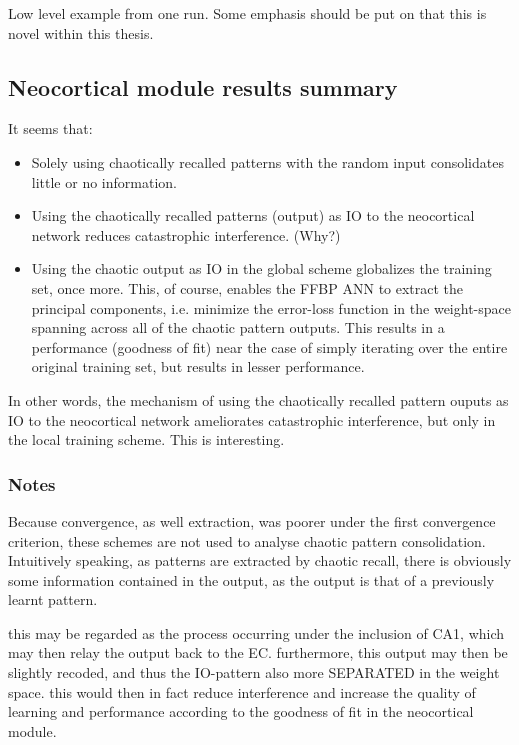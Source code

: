 Low level example from one run. Some emphasis should be put on that this is novel within this thesis.

\subsection{Neocortical module results summary}

It seems that:

\begin{itemize}
    \item Solely using chaotically recalled patterns with the random input consolidates little or no information.
    \item Using the chaotically recalled patterns (output) as IO to the neocortical network reduces catastrophic interference. (Why?)
    \item Using the chaotic output as IO in the global scheme globalizes the training set, once more. This, of course, enables the FFBP ANN to extract the principal components, i.e. minimize the error-loss function in the weight-space spanning across all of the chaotic pattern outputs. This results in a performance (goodness of fit) near the case of simply iterating over the entire original training set, but results in lesser performance.
\end{itemize}

In other words, the mechanism of using the chaotically recalled pattern ouputs as IO to the neocortical network ameliorates catastrophic interference, but only in the local training scheme. This is interesting.

\subsubsection{Notes}

Because convergence, as well extraction, was poorer under the first convergence criterion, these schemes are not used to analyse chaotic pattern consolidation.
Intuitively speaking, as patterns are extracted by chaotic recall, there is obviously some information contained in the output, as the output is that of a previously learnt pattern.

this may be regarded as the process occurring under the inclusion of CA1, which may then relay the output back to the EC. furthermore, this output may then be slightly recoded, and thus the IO-pattern also more SEPARATED in the weight space. this would then in fact reduce interference and increase the quality of learning and performance according to the goodness of fit in the neocortical module.



